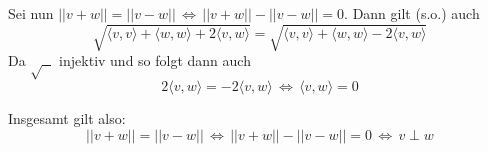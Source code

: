 \documentclass[a4paper,graphics,11pt]{article}
\begin{document}
Sei nun $||v+w|| = ||v-w|| \,\Longleftrightarrow\, ||v+w|| - ||v-w|| = 0$.
Dann gilt (s.o.) auch
$$
   \sqrt{\langle v,v \rangle + \langle w,w \rangle + 2\langle v,w \rangle} =
        \sqrt{\langle v,v \rangle + \langle w,w \rangle - 2 \langle v,w \rangle}
$$
Da $\sqrt{\text{ }}$ injektiv und so folgt dann auch
$$
    2\langle v,w \rangle = - 2 \langle v,w \rangle
    \,\Longleftrightarrow\, \langle v,w \rangle = 0
$$

Insgesamt gilt also:
$$
    ||v+w|| = ||v-w||
    \,\Longleftrightarrow\, ||v+w||-||v-w|| = 0
    \,\Longleftrightarrow\, v \perp w
$$
\end{document}

